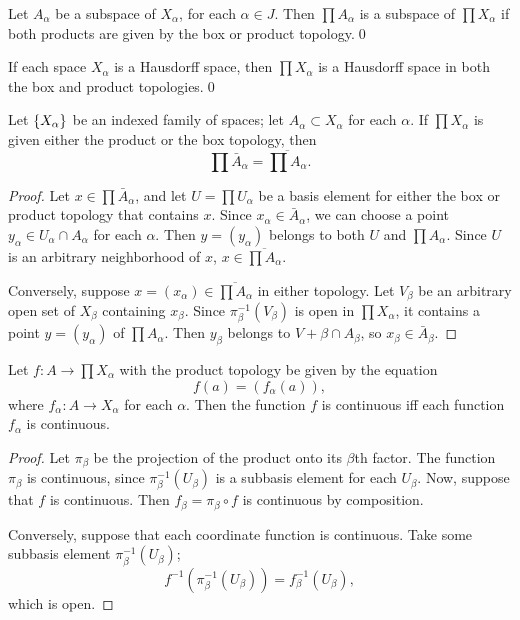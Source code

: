 \documentclass[10pt]{report}
\begin{document}
\begin{theorem}
  Let $A_\alpha$ be a subspace of $X_\alpha$, for each $\alpha \in J$.
  Then $\prod A_\alpha$ is a subspace of $\prod X_\alpha$ if both products are given by the box or product topology.\qed
\end{theorem}

\begin{theorem}
  If each space $X_\alpha$ is a Hausdorff space, then $\prod X_\alpha$ is a Hausdorff space in both the box and product topologies.\qed
\end{theorem}

\begin{theorem}
  Let $\left\{ X_\alpha \right\}$ be an indexed family of spaces;
  let $A_\alpha \subset X_\alpha$ for each $\alpha$.
  If $\prod X_\alpha$ is given either the product or the box topology, then
  \[
    \prod \bar A_\alpha = \overline{\prod A_\alpha}.
  \]
\end{theorem}
\begin{proof}
  Let $x \in \prod \bar A_\alpha$, and let $U = \prod U_\alpha$ be a basis element for either the box or product topology that contains $x$.
  Since $x_\alpha \in \bar A_\alpha$, we can choose a point $y_\alpha \in U_\alpha \cap A_\alpha$ for each $\alpha$.
  Then $y = (y_\alpha)$ belongs to both $U$ and $\prod A_\alpha$.
  Since $U$ is an arbitrary neighborhood of $x$, $x \in \overline{\prod A_\alpha}$.

  Conversely, suppose $x = (x_\alpha) \in \overline{\prod A_\alpha}$ in either topology.
  Let $V_\beta$ be an arbitrary open set of $X_\beta$ containing $x_\beta$.
  Since $\pi_\beta^{-1}(V_\beta)$ is open in $\prod X_\alpha$, it contains a point $y = (y_\alpha)$ of $\prod A_\alpha$.
  Then $y_\beta$ belongs to $V+\beta \cap A_\beta$, so $x_\beta \in \bar A_\beta$.
\end{proof}

\begin{theorem}
  Let $f:A \rightarrow \prod X_\alpha$ with the product topology be given by the equation
  \[
    f(a) = (f_\alpha(a)),
  \]
  where $f_\alpha:A \rightarrow X_\alpha$ for each $\alpha$.
  Then the function $f$ is continuous iff each function $f_\alpha$ is continuous.
\end{theorem}
\begin{proof}
  Let $\pi_\beta$ be the projection of the product onto its $\beta$th factor.
  The function $\pi_\beta$ is continuous, since $\pi_\beta^{-1}(U_\beta)$ is a subbasis element for each $U_\beta$.
  Now, suppose that $f$ is continuous.
  Then $f_\beta = \pi_\beta \circ f$ is continuous by composition.

  Conversely, suppose that each coordinate function is continuous.
  Take some subbasis element $\pi_\beta^{-1}(U_\beta)$;
  \[
    f^{-1}(\pi_\beta^{-1}(U_\beta)) = f^{-1}_\beta(U_\beta),
  \]
  which is open.
\end{proof}
\end{document}
